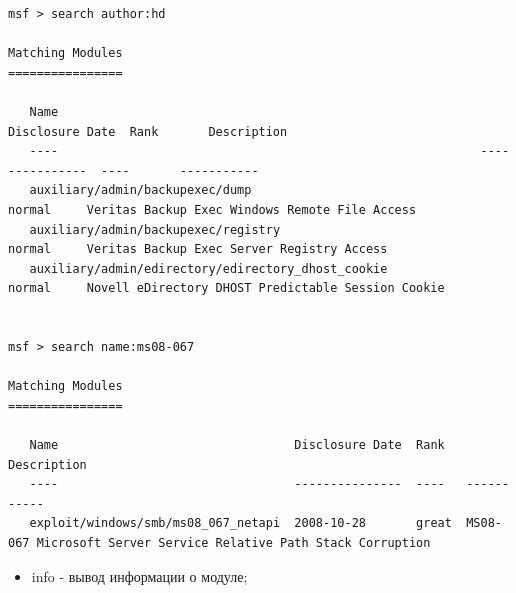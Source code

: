 \documentclass[10pt,a4paper,titlepage]{article}
\begin{document}
\begin{verbatim}
msf > search author:hd

Matching Modules
================

   Name                                                           Disclosure Date  Rank       Description
   ----                                                           ---------------  ----       -----------
   auxiliary/admin/backupexec/dump                                                 normal     Veritas Backup Exec Windows Remote File Access
   auxiliary/admin/backupexec/registry                                             normal     Veritas Backup Exec Server Registry Access
   auxiliary/admin/edirectory/edirectory_dhost_cookie                              normal     Novell eDirectory DHOST Predictable Session Cookie


msf > search name:ms08-067

Matching Modules
================

   Name                                 Disclosure Date  Rank   Description
   ----                                 ---------------  ----   -----------
   exploit/windows/smb/ms08_067_netapi  2008-10-28       great  MS08-067 Microsoft Server Service Relative Path Stack Corruption
\end{verbatim}
\begin{itemize}
\item info - вывод информации о модуле;
\end{itemize}
\end{document}
